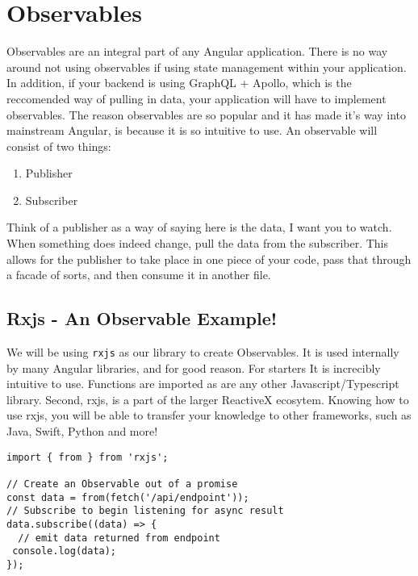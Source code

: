 \maketitle{}
\section{ Observables }
Observables are an integral part of any Angular application. There is no way 
around not using observables if using state management within your application. 
In addition, if your backend is using GraphQL + Apollo, which is the 
reccomended way of pulling in data, your application will have to implement 
observables. The reason observables are so popular and it has made it's way
into mainstream Angular, is because it is so intuitive to use. An observable 
will consist of two things: 
\begin{enumerate}
  \item Publisher 
  \item Subscriber
\end{enumerate}

Think of a publisher as a way of saying here is the data, I want you to watch. 
When something does indeed change, pull the data from the subscriber. This 
allows for the publisher to take place in one piece of your code, pass that 
through a facade of sorts, and then consume it in another file. 

\subsection{ Rxjs - An Observable Example! }
We will be using \lstinline{rxjs} as our library to create Observables. It is 
used internally by many Angular libraries, and for good reason. For starters
It is increcibly intuitive to use. Functions are imported as are any other 
Javascript/Typescript library. Second, rxjs, is a part of the larger ReactiveX 
ecosytem. Knowing how to use rxjs, you will be able to transfer your knowledge
to other frameworks, such as Java, Swift, Python and more!

\begin{lstlisting}
import { from } from 'rxjs';

// Create an Observable out of a promise
const data = from(fetch('/api/endpoint'));
// Subscribe to begin listening for async result
data.subscribe((data) => {
  // emit data returned from endpoint
 console.log(data);
});
\end{lstlisting}

